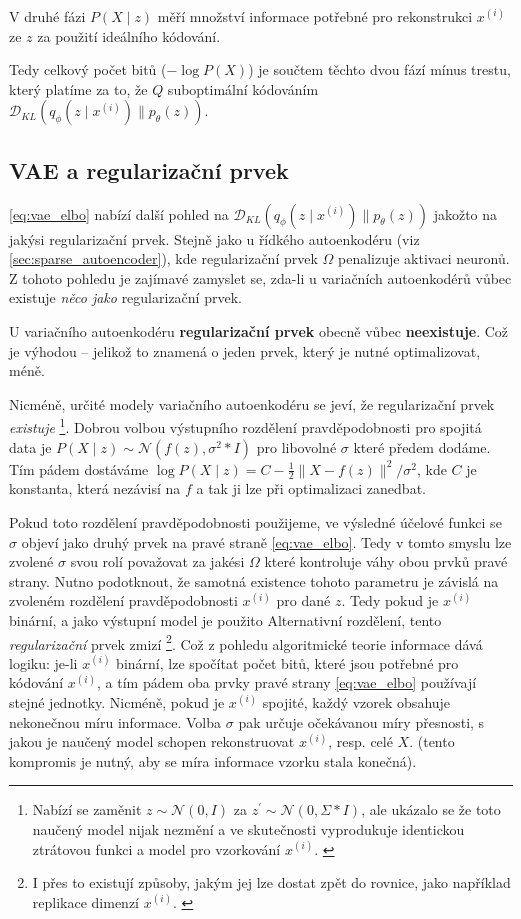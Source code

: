V druhé fázi $P(X\mid z)$ měří množství informace potřebné pro rekonstrukci $x^{(i)}$ ze $z$ za použití ideálního kódování.

Tedy celkový počet bitů ($- \log P(X)$) je součtem těchto dvou fází mínus trestu, který platíme za to, že $Q$ suboptimální kódováním $\mathcal{D}_{KL}(q_\phi(z\mid x^{(i)})\parallel p_\theta(z))$. \cite{Doersch2021}


\subsection{VAE a regularizační prvek}
\label{sec:vae_regulariazion_term}
\autoref{eq:vae_elbo} nabízí další pohled na $\mathcal{D}_{KL}(q_\phi(z\mid x^{(i)})\parallel p_\theta(z))$ jakožto na jakýsi regularizační prvek.
Stejně jako u řídkého autoenkodéru (viz \autoref{sec:sparse_autoencoder}), kde regularizační prvek $\Omega$ penalizuje aktivaci neuronů.
Z tohoto pohledu je zajímavé zamyslet se, zda-li u variačních autoenkodérů vůbec existuje \emph{něco jako} regularizační prvek. \cite{Doersch2021}

U variačního autoenkodéru \textbf{regularizační prvek} obecně vůbec \textbf{neexistuje}.
Což je výhodou – jelikož to znamená o jeden prvek, který je nutné optimalizovat, méně. \cite{Doersch2021}

Nicméně, určité modely variačního autoenkodéru se jeví, že regularizační prvek \emph{existuje}
\footnote{Nabízí se zaměnit $z \sim \mathcal{N}(0, I)$ za $z^\prime \sim \mathcal{N}(0, \Sigma * I)$, ale ukázalo se že toto naučený model nijak nezmění a ve skutečnosti vyprodukuje identickou ztrátovou funkci a model pro vzorkování $x^{(i)}$. \cite{Doersch2021}}.
Dobrou volbou výstupního rozdělení pravděpodobnosti pro spojitá data je $P(X\mid z) \sim \mathcal{N}(f(z), \sigma^2 * I)$ pro libovolné $\sigma$ které předem dodáme.
Tím pádem dostáváme $\log P(X\mid z) = C - \frac{1}{2} \| X - f(z) \|^2 / \sigma^2$, kde $C$ je konstanta, která nezávisí na $f$ a tak ji lze při optimalizaci zanedbat. \cite{Doersch2021}

Pokud toto rozdělení pravděpodobnosti použijeme, ve výsledné účelové funkci se $\sigma$ objeví jako druhý prvek na pravé straně \autoref{eq:vae_elbo}.
Tedy v tomto smyslu lze zvolené $\sigma$ svou rolí považovat za jakési $\Omega$ které kontroluje váhy obou prvků pravé strany.
Nutno podotknout, že samotná existence tohoto parametru je závislá na zvoleném rozdělení pravděpodobnosti $x^{(i)}$ pro dané $z$.
Tedy pokud je $x^{(i)}$ binární, a jako výstupní model je použito Alternativní rozdělení, tento \emph{regularizační} prvek zmizí 
\footnote{I přes to existují způsoby, jakým jej lze dostat zpět do rovnice, jako například replikace dimenzí $x^{(i)}$. \cite{Doersch2021}}.
Což z pohledu algoritmické teorie informace dává logiku: je-li $x^{(i)}$ binární, lze spočítat počet bitů, které jsou potřebné pro kódování $x^{(i)}$, a tím pádem oba prvky pravé strany \autoref{eq:vae_elbo} používají stejné jednotky.
Nicméně, pokud je $x^{(i)}$ spojité, každý vzorek obsahuje nekonečnou míru informace. Volba $\sigma$ pak určuje očekávanou míry přesnosti, s jakou je naučený model schopen rekonstruovat $x^{(i)}$, resp. celé $X$. (tento kompromis je nutný, aby se míra informace vzorku stala konečná). \cite{Doersch2021}
